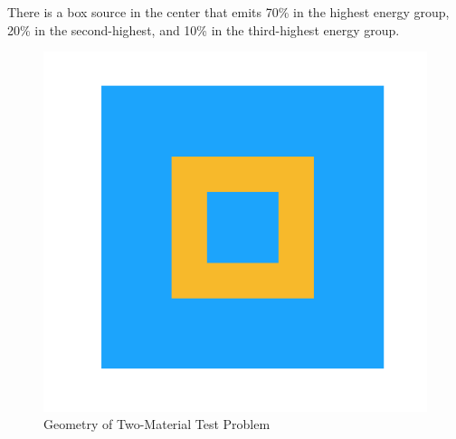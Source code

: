 
\DIFdelend %
There is a box source in the center that emits 70\% in the highest energy group, 20\% in the second-highest, and 10\% in the third-highest energy group.
\begin{figure}[H]
    \centering
    \includegraphics[width=.3\textwidth]{fig/Geometry.png}
    \caption{Geometry of Two-Material Test Problem}
    \label{fig:test_geometry}
\end{figure}

